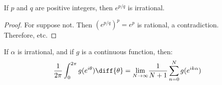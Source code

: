         \begin{theorem}
            If $p$ and $q$ are positive integers, then
            $e^{p/q}$ is irrational.
        \end{theorem}
        \begin{proof}
            For suppose not. Then
            $(e^{p/q})^{p}=e^{p}$ is rational, a contradiction.
            Therefore, etc.
        \end{proof}
        \begin{theorem}
            If $\alpha$ is irrational, and if $g$ is a continuous
            function, then:
            \begin{equation*}
                \frac{1}{2\pi}\int_{0}^{2\pi}g(e^{i\theta})\diff{\theta}
                =\underset{N\rightarrow\infty}{\lim}
                \frac{1}{N+1}\sum_{n=0}^{N}g(e^{ik\alpha})
            \end{equation*}
        \end{theorem}
